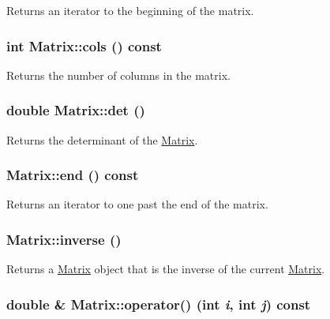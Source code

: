 Returns an iterator to the beginning of the matrix. 

\hypertarget{class_matrix_ac9586a9d7bba127292ce84b1e8ee9cc1}{
\subsubsection[{cols}]{\setlength{\rightskip}{0pt plus 5cm}int Matrix::cols () const}}
\label{class_matrix_ac9586a9d7bba127292ce84b1e8ee9cc1}


Returns the number of columns in the matrix. 

\hypertarget{class_matrix_ace95025dd985ddaa6c1ed72e8b464a0a}{
\subsubsection[{det}]{\setlength{\rightskip}{0pt plus 5cm}double Matrix::det ()}}
\label{class_matrix_ace95025dd985ddaa6c1ed72e8b464a0a}


Returns the determinant of the \hyperlink{class_matrix}{Matrix}. 

\hypertarget{class_matrix_aa6e886dcd213fdf5c54743f3b8ac7209}{
\subsubsection[{end}]{ Matrix::end () const}}
\label{class_matrix_aa6e886dcd213fdf5c54743f3b8ac7209}


Returns an iterator to one past the end of the matrix. 

\hypertarget{class_matrix_ac4f5e7d4bb1bfd6586bd3384bd2a02b0}{
\subsubsection[{inverse}]{ Matrix::inverse ()}}
\label{class_matrix_ac4f5e7d4bb1bfd6586bd3384bd2a02b0}


Returns a \hyperlink{class_matrix}{Matrix} object that is the inverse of the current \hyperlink{class_matrix}{Matrix}. 

\hypertarget{class_matrix_a3d361fded5f8992d2202894ca141eb72}{
\subsubsection[{operator()}]{\setlength{\rightskip}{0pt plus 5cm}double \& Matrix::operator() (int {\em i}, \/  int {\em j}) const}}
\label{class_matrix_a3d361fded5f8992d2202894ca141eb72}


